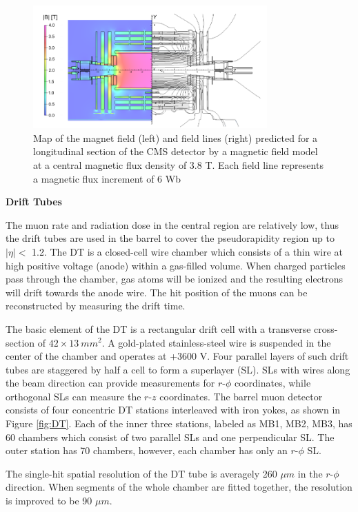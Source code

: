 \documentclass[thesis.tex]{subfiles}
\begin{document}
\begin{figure}[hbt]
	\centering
	\includegraphics[width=0.8\textwidth]{plot/magnet.png}
	\caption{Map of the magnet field (left) and field lines (right) predicted for a longitudinal section of the CMS detector by a magnetic field model at a central magnetic flux density of 3.8 T. Each field line represents a magnetic flux increment of 6 Wb}
	\label{fig:magnet}
\end{figure}

\noindent \textbf{Drift Tubes} 

The muon rate and radiation dose in the central region are relatively low, thus the drift tubes are used in the barrel to cover the pseudorapidity region up to $|\eta| < $ 1.2.
The DT is a closed-cell wire chamber which consists of a thin wire at high positive voltage (anode) within a gas-filled volume.
When charged particles pass through the chamber, gas atoms will be ionized and the resulting electrons will drift towards the anode wire.
The hit position of the muons can be reconstructed by measuring the drift time.  

The basic element of the DT is a rectangular drift cell with a transverse cross-section of $42 \times 13\ mm^2$. 
A gold-plated stainless-steel wire is suspended in the center of the chamber and operates at +3600 V. 
Four parallel layers of such drift tubes are staggered by half a cell to form a superlayer (SL). 
SLs with wires along the beam direction can provide measurements for $r\text{-}\phi$ coordinates, while orthogonal SLs can measure the $r\text{-}z$ coordinates. 
The barrel muon detector consists of four concentric DT stations interleaved with iron yokes, as shown in Figure \ref{fig:DT}.
Each of the inner three stations, labeled as MB1, MB2, MB3, has 60 chambers which consist of two parallel SLs and one perpendicular SL. 
The outer station has 70 chambers, however, each chamber has only an $r\text{-}\phi$ SL. 

The single-hit spatial resolution of the DT tube is averagely 260 $\mu m$ in the $r\text{-}\phi$ direction.
When segments of the whole chamber are fitted together, the resolution is improved to be 90 $\mu m$.
\end{document}
